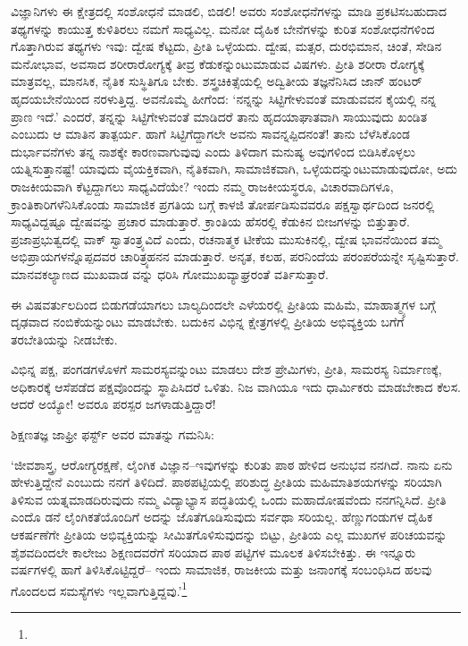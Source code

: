 ವಿಜ್ಞಾನಿಗಳು ಈ ಕ್ಷೇತ್ರದಲ್ಲಿ ಸಂಶೋಧನೆ ಮಾಡಲಿ, ಬಿಡಲಿ! ಅವರು ಸಂಶೋಧನೆಗಳನ್ನು ಮಾಡಿ ಪ್ರಕಟಿಸಬಹುದಾದ ತಥ್ಯಗಳನ್ನು ಕಾಯುತ್ತ ಕುಳಿತಿರಲು ನಮಗೆ ಸಾಧ್ಯವಿಲ್ಲ. ಮನೋ ದೈಹಿಕ ಬೇನೆಗಳನ್ನು ಕುರಿತ ಸಂಶೋಧನೆಗಳಿಂದ ಗೊತ್ತಾಗಿರುವ ತಥ್ಯಗಳು ಇವು: ದ್ವೇಷ ಕೆಟ್ಟದು, ಪ್ರೀತಿ ಒಳ್ಳೆಯದು. ದ್ವೇಷ, ಮತ್ಸರ, ದುರಭಿಮಾನ, ಚಿಂತೆ, ಸೇಡಿನ ಮನೋಭಾವ, ಅವಸಾದ ಶರೀರಾರೋಗ್ಯಕ್ಕೆ ತೀವ್ರ ಕೆಡುಕನ್ನುಂಟುಮಾಡುವ ವಿಷಗಳು. ಪ್ರೀತಿ ಶರೀರಾ ರೋಗ್ಯಕ್ಕೆ ಮಾತ್ರವಲ್ಲ, ಮಾನಸಿಕ, ನೈತಿಕ ಸುಸ್ಥಿತಿಗೂ ಬೇಕು. ಶಸ್ತ್ರಚಿಕಿತ್ಸೆಯಲ್ಲಿ ಅದ್ವಿತೀಯ ತಜ್ಞನೆನಿಸಿದ ಜಾನ್ ಹಂಟರ್ ಹೃದಯಬೇನೆಯಿಂದ ನರಳುತ್ತಿದ್ದ. ಅವನೊಮ್ಮೆ ಹೀಗೆಂದ: ‘ನನ್ನನ್ನು ಸಿಟ್ಟಿಗೇಳುವಂತೆ ಮಾಡುವವನ ಕೈಯಲ್ಲಿ ನನ್ನ ಪ್ರಾಣ ಇದೆ.’ ಎಂದರೆ, ತನ್ನನ್ನು ಸಿಟ್ಟಿಗೇಳುವಂತೆ ಮಾಡಿದರೆ ತಾನು ಹೃದಯಾಘಾತವಾಗಿ ಸಾಯುವುದು ಖಂಡಿತ ಎಂಬುದು ಆ ಮಾತಿನ ತಾತ್ಪರ್ಯ. ಹಾಗೆ ಸಿಟ್ಟಿಗೆದ್ದಾಗಲೇ ಅವನು ಸಾವನ್ನಪ್ಪಿದನಂತೆ! ತಾನು ಬೆಳೆಸಿಕೊಂಡ ದುರ್ಭಾವನೆಗಳು ತನ್ನ ನಾಶಕ್ಕೇ ಕಾರಣವಾಗುವುವು ಎಂದು ತಿಳಿದಾಗ ಮನುಷ್ಯ ಅವುಗಳಿಂದ ಬಿಡಿಸಿಕೊಳ್ಳಲು ಯತ್ನಿಸುತ್ತಾನಷ್ಟೆ! ಯಾವುದು ವೈಯಕ್ತಿಕವಾಗಿ, ನೈತಿಕವಾಗಿ, ಸಾಮಾಜಿಕವಾಗಿ, ಒಳ್ಳೆಯದನ್ನುಂಟುಮಾಡುವುದೋ, ಅದು ರಾಜಕೀಯವಾಗಿ ಕೆಟ್ಟದ್ದಾಗಲು ಸಾಧ್ಯವಿದೆಯೇ? ಇಂದು ನಮ್ಮ ರಾಜಕೀಯಸ್ಥರೂ, ವಿಚಾರವಾದಿಗಳೂ, ಕ್ರಾಂತಿಕಾರಿಗಳೆನಿಸಿಕೊಂಡು ಸಾಮಾಜಿಕ ಪ್ರಗತಿಯ ಬಗ್ಗೆ ಕಾಳಜಿ ತೋರ್ಪಡಿಸುವವರೂ ಪಕ್ಷಸ್ವಾರ್ಥದಿಂದ ಜನರಲ್ಲಿ ಸಾಧ್ಯವಿದ್ದಷ್ಟೂ ದ್ವೇಷವನ್ನು ಪ್ರಚಾರ ಮಾಡುತ್ತಾರೆ. ಕ್ರಾಂತಿಯ ಹೆಸರಲ್ಲಿ ಕೆಡುಕಿನ ಬೀಜಗಳನ್ನು ಬಿತ್ತುತ್ತಾರೆ. ಪ್ರಜಾಪ್ರಭುತ್ವದಲ್ಲಿ ವಾಕ್ ಸ್ವಾತಂತ್ರ್ಯವಿದೆ ಎಂದು, ರಚನಾತ್ಮಕ ಟೀಕೆಯ ಮುಸುಕಿನಲ್ಲಿ, ದ್ವೇಷ ಭಾವನೆಯಿಂದ ತಮ್ಮ ಅಭಿಪ್ರಾಯಗಳನ್ನೊಪ್ಪದವರ ಚಾರಿತ್ರ್ಯಹನನ ಮಾಡುತ್ತಾರೆ. ಅನೃತ, ಕಲಹ, ಪರನಿಂದೆಯ ಪರಂಪರೆಯನ್ನೇ ಸೃಷ್ಟಿಸುತ್ತಾರೆ. ಮಾನವಕಲ್ಯಾಣದ ಮುಖವಾಡ ವನ್ನು ಧರಿಸಿ ಗೋಮುಖವ್ಯಾಘ್ರರಂತೆ ವರ್ತಿಸುತ್ತಾರೆ.

ಈ ವಿಷವರ್ತುಲದಿಂದ ಬಿಡುಗಡೆಯಾಗಲು ಬಾಲ್ಯದಿಂದಲೇ ಎಳೆಯರಲ್ಲಿ ಪ್ರೀತಿಯ ಮಹಿಮೆ, ಮಾಹಾತ್ಮ್ಯಗಳ ಬಗ್ಗೆ ದೃಢವಾದ ನಂಬಿಕೆಯನ್ನುಂಟು ಮಾಡಬೇಕು. ಬದುಕಿನ ವಿಭಿನ್ನ ಕ್ಷೇತ್ರಗಳಲ್ಲಿ ಪ್ರೀತಿಯ ಅಭಿವ್ಯಕ್ತಿಯ ಬಗೆಗೆ ತರಬೇತಿಯನ್ನು ನೀಡಬೇಕು.

ವಿಭಿನ್ನ ಪಕ್ಷ, ಪಂಗಡಗಳೊಳಗೆ ಸಾಮರಸ್ಯವನ್ನುಂಟು ಮಾಡಲು ದೇಶ ಪ್ರೇಮಿಗಳು, ಪ್ರೀತಿ, ಸಾಮರಸ್ಯ ನಿರ್ಮಾಣಕ್ಕೆ, ಅಧಿಕಾರಕ್ಕೆ ಆಸೆಪಡೆದ ಪಕ್ಷವೊಂದನ್ನು ಸ್ಥಾಪಿಸಿದರೆ ಒಳಿತು. ನಿಜ ವಾಗಿಯೂ ಇದು ಧಾರ್ಮಿಕರು ಮಾಡಬೇಕಾದ ಕೆಲಸ. ಆದರೆ ಅಯ್ಯೋ! ಅವರೂ ಪರಸ್ಪರ ಜಗಳಾಡುತ್ತಿದ್ದಾರೆ!

ಶಿಕ್ಷಣತಜ್ಞ ಜಾಫ್ರೀ ಫರ್ಸ್ಟ್ ಅವರ ಮಾತನ್ನು ಗಮನಿಸಿ:

‘ಜೀವಶಾಸ್ತ್ರ, ಆರೋಗ್ಯರಕ್ಷಣೆ, ಲೈಂಗಿಕ ವಿಜ್ಞಾನ–ಇವುಗಳನ್ನು ಕುರಿತು ಪಾಠ ಹೇಳಿದ ಅನುಭವ ನನಗಿದೆ. ನಾನು ಏನು ಹೇಳುತ್ತಿದ್ದೇನೆ ಎಂಬುದು ನನಗೆ ತಿಳಿದಿದೆ. ಪಾಠಪಟ್ಟಿಯಲ್ಲಿ ಪರಿಶುದ್ಧ ಪ್ರೀತಿಯ ಮಹಿಮಾತಿಶಯಗಳನ್ನು ಸರಿಯಾಗಿ ತಿಳಿಸುವ ಯತ್ನಮಾಡದಿರುವುದು ನಮ್ಮ ವಿದ್ಯಾಭ್ಯಾಸ ಪದ್ಧತಿಯಲ್ಲಿ ಒಂದು ಮಹಾದೋಷವೆಂದು ನನಗನ್ನಿಸಿದೆ. ಪ್ರೀತಿ ಎಂದೊ ಡನೆ ಲೈಂಗಿಕತೆಯೊಂದಿಗೆ ಅದನ್ನು ಜೊತೆಗೂಡಿಸುವುದು ಸರ್ವಥಾ ಸರಿಯಲ್ಲ. ಹೆಣ್ಣುಗಂಡುಗಳ ದೈಹಿಕ ಆಕರ್ಷಣೆಗೇ ಪ್ರೀತಿಯ ಅಭಿವ್ಯಕ್ತಿಯನ್ನು ಸೀಮಿತಗೊಳಿಸುವುದನ್ನು ಬಿಟ್ಟು, ಪ್ರೀತಿಯ ಎಲ್ಲ ಮುಖಗಳ ಪರಿಚಯವನ್ನು ಶೈಶವದಿಂದಲೇ ಕಾಲೇಜು ಶಿಕ್ಷಣದವರೆಗೆ ಸರಿಯಾದ ಪಾಠ ಪಟ್ಟಿಗಳ ಮೂಲಕ ತಿಳಿಸಬೇಕಿತ್ತು. ಈ ಇನ್ನೂರು ವರ್ಷಗಳಲ್ಲಿ ಹಾಗೆ ತಿಳಿಸಿಕೊಟ್ಟಿದ್ದರೆ– ಇಂದು ಸಾಮಾಜಿಕ, ರಾಜಕೀಯ ಮತ್ತು ಜನಾಂಗಕ್ಕೆ ಸಂಬಂಧಿಸಿದ ಹಲವು ಗೊಂದಲದ ಸಮಸ್ಯೆಗಳು ಇಲ್ಲವಾಗುತ್ತಿದ್ದವು.’\footnote{}


